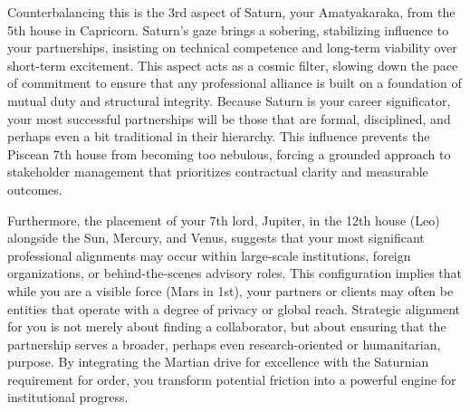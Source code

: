 {\fontsize{9}{13}\selectfont Counterbalancing this is the 3rd aspect of Saturn, your Amatyakaraka, from the 5th house in Capricorn. Saturn's gaze brings a sobering, stabilizing influence to your partnerships, insisting on technical competence and long-term viability over short-term excitement. This aspect acts as a cosmic filter, slowing down the pace of commitment to ensure that any professional alliance is built on a foundation of mutual duty and structural integrity. Because Saturn is your career significator, your most successful partnerships will be those that are formal, disciplined, and perhaps even a bit traditional in their hierarchy. This influence prevents the Piscean 7th house from becoming too nebulous, forcing a grounded approach to stakeholder management that prioritizes contractual clarity and measurable outcomes.}\par\vspace{1.8mm}

{\fontsize{9}{13}\selectfont Furthermore, the placement of your 7th lord, Jupiter, in the 12th house (Leo) alongside the Sun, Mercury, and Venus, suggests that your most significant professional alignments may occur within large-scale institutions, foreign organizations, or behind-the-scenes advisory roles. This configuration implies that while you are a visible force (Mars in 1st), your partners or clients may often be entities that operate with a degree of privacy or global reach. Strategic alignment for you is not merely about finding a collaborator, but about ensuring that the partnership serves a broader, perhaps even research-oriented or humanitarian, purpose. By integrating the Martian drive for excellence with the Saturnian requirement for order, you transform potential friction into a powerful engine for institutional progress.}\par\vspace{1.8mm}

